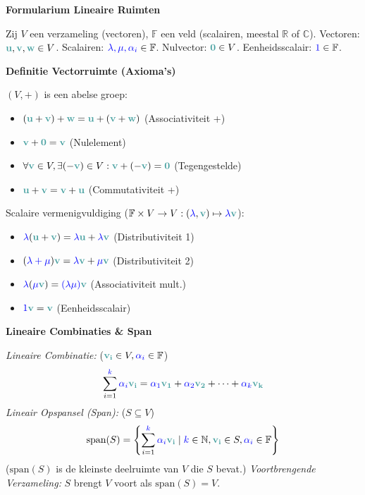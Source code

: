 \documentclass[12pt]{article}
\renewcommand{\vec}[1]{\textcolor{vectorTeal}{\mathbf{#1}}}
\newcommand{\scalar}[1]{\textcolor{scalarBrightBlue}{#1}}
\newcommand{\field}[1]{\mathbb{#1}}
\begin{document}
\begin{center}
\Large \textbf{Formularium Lineaire Ruimten}
\end{center}

\vspace{1em} %

Zij $V$ een verzameling (vectoren), $\field{F}$ een veld (scalairen, meestal $\field{R}$ of $\field{C}$).
Vectoren: $\vec{u}, \vec{v}, \vec{w} \in V$. Scalairen: $\scalar{\lambda, \mu, \alpha_i} \in \field{F}$.
Nulvector: $\vec{0} \in V$. Eenheidsscalair: $\scalar{1} \in \field{F}$.

\vspace{1.5em} %
{\centering
\textcolor{headerBrown}{\large\textbf{Definitie Vectorruimte (Axioma's)}}
\par
}%
$(V, +)$ is een abelse groep:
\begin{itemize}
    \item $(\vec{u} + \vec{v}) + \vec{w} = \vec{u} + (\vec{v} + \vec{w})$ (Associativiteit +)
    \item $\vec{v} + \vec{0} = \vec{v}$ (Nulelement)
    \item $\forall \vec{v} \in V, \exists (-\vec{v}) \in V: \vec{v} + (-\vec{v}) = \vec{0}$ (Tegengestelde)
    \item $\vec{u} + \vec{v} = \vec{v} + \vec{u}$ (Commutativiteit +)
\end{itemize}
Scalaire vermenigvuldiging ($\field{F} \times V \to V: (\scalar{\lambda}, \vec{v}) \mapsto \scalar{\lambda}\vec{v}$):
\begin{itemize}
    \item $\scalar{\lambda}(\vec{u}+\vec{v}) = \scalar{\lambda}\vec{u} + \scalar{\lambda}\vec{v}$ (Distributiviteit 1)
    \item $(\scalar{\lambda+\mu})\vec{v} = \scalar{\lambda}\vec{v} + \scalar{\mu}\vec{v}$ (Distributiviteit 2)
    \item $\scalar{\lambda}(\scalar{\mu}\vec{v}) = \scalar{(\lambda\mu)}\vec{v}$ (Associativiteit mult.)
    \item $\scalar{1}\vec{v} = \vec{v}$ (Eenheidsscalair)
\end{itemize}

\vspace{1.5em} %
{\centering
\textcolor{headerBrown}{\large\textbf{Lineaire Combinaties \& Span}}
\par
}%
\textit{Lineaire Combinatie:} ($\vec{v_i} \in V, \scalar{\alpha_i} \in \field{F}$)
\[
\sum_{i=1}^{\scalar{k}} \scalar{\alpha_i} \vec{v_i} = \scalar{\alpha_1}\vec{v_1} + \scalar{\alpha_2}\vec{v_2} + \dots + \scalar{\alpha_k}\vec{v_k}
\]
\textit{Lineair Opspansel (Span):} ($S \subseteq V$)
\[
\text{span}(S) = \left\{ \sum_{i=1}^{\scalar{k}} \scalar{\alpha_i} \vec{v_i} \mid \scalar{k} \in \mathbb{N}, \vec{v_i} \in S, \scalar{\alpha_i} \in \field{F} \right\}
\]
($\text{span}(S)$ is de kleinste deelruimte van $V$ die $S$ bevat.)
\textit{Voortbrengende Verzameling:} $S$ brengt $V$ voort als $\text{span}(S) = V$.
\end{document}

